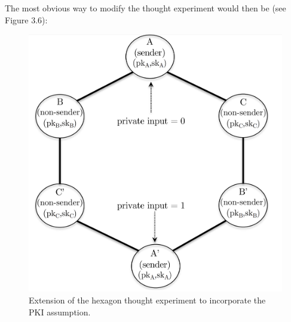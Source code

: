 \noindent
The most obvious way to modify the thought experiment would then be (see Figure 3.6):
\begin{figure}[h]
    \centering
    \includegraphics[scale = 0.5]{figures/f11.png}
    \caption{Extension of the hexagon thought experiment to incorporate the PKI assumption.}
    \label{fig:mesh1}
\end{figure}\\

